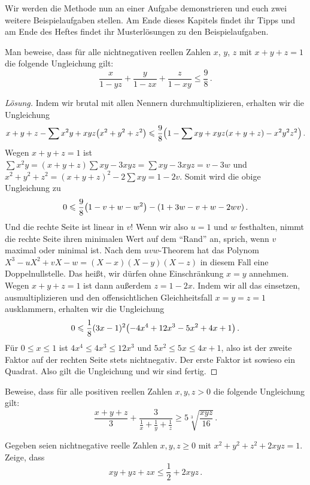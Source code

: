 Wir werden die Methode nun an einer Aufgabe demonstrieren und euch zwei weitere  Beispielaufgaben stellen. Am Ende dieses Kapitels findet ihr Tipps und am Ende des Heftes findet ihr Musterlösungen zu den Beispielaufgaben.
\begin{aufgabe*}
	Man beweise, dass für alle nichtnegativen reellen Zahlen $x$, $y$, $z$ mit $x+y+z=1$ die folgende Ungleichung gilt:
	\begin{equation*}
		\frac{x}{1-yz}+\frac{y}{1-zx}+\frac{z}{1-xy}\leqslant\frac 98\,.
	\end{equation*}
\end{aufgabe*}
\begin{proof}[Lösung]
	Indem wir brutal mit allen Nennern durchmultiplizieren, erhalten wir die Ungleichung
	\begin{equation*}
		x+y+z-\sum x^2y+xyz\parens*{x^2+y^2+z^2}\leqslant \frac 98\parens*{1-\sum xy+xyz(x+y+z)-x^2y^2z^2}\,.
	\end{equation*}
	Wegen $x+y+z=1$ ist $\sum x^2y=(x+y+z)\sum xy-3xyz=\sum xy-3xyz=v-3w$ und $x^2+y^2+z^2=(x+y+z)^2-2\sum xy=1-2v$. Somit wird die obige Ungleichung zu
	\begin{equation*}
		0\leqslant \frac 98\parens*{1-v+w-w^2}-\parens*{1+3w-v+w-2wv}\,.
	\end{equation*}
	Und die rechte Seite ist linear in $v$! Wenn wir also $u=1$ und $w$ festhalten, nimmt die rechte Seite ihren minimalen Wert auf dem \enquote{Rand} an, sprich, wenn $v$ maximal oder minimal ist. Nach dem $uvw$-Theorem hat das Polynom $X^3-uX^2+vX-w=(X-x)(X-y)(X-z)$ in diesem Fall eine Doppelnullstelle. Das heißt, wir dürfen ohne Einschränkung $x=y$ annehmen. Wegen $x+y+z=1$ ist dann außerdem $z=1-2x$. Indem wir all das einsetzen, ausmultiplizieren und den offensichtlichen Gleichheitsfall $x=y=z=1$ ausklammern, erhalten wir die Ungleichung
	\begin{equation*}
		0\leqslant \frac18(3x-1)^2\parens*{-4x^4+12x^3-5x^2+4x+1}\,.
	\end{equation*}
	Für $0\leqslant x\leqslant 1$ ist $4x^4\leqslant 4x^3\leqslant 12x^3$ und $5x^2\leqslant 5x\leqslant 4x+1$, also ist der zweite Faktor auf der rechten Seite stets nichtnegativ. Der erste Faktor ist sowieso ein Quadrat. Also gilt die Ungleichung und wir sind fertig.
\end{proof}

\begin{aufgabe*}\label{aufgabe:DEMO2015Ungleichung}
	Beweise, dass für alle positiven reellen Zahlen $x,y,z>0$ die folgende Ungleichung gilt:
	\begin{equation*}
		\frac{x+y+z}{3}+\frac{3}{\frac1x+\frac1y+\frac1z}\geqslant 5\sqrt[3]{\frac{xyz}{16}}\,.
	\end{equation*}
\end{aufgabe*}
\begin{aufgabe*}[*]\label{aufgabe:UngleichungInvertieren}
	Gegeben seien nichtnegative reelle Zahlen $x,y,z\geqslant 0$ mit $x^2+y^2+z^2+2xyz=1$. Zeige, dass
	\begin{equation*}
		xy+yz+zx\leqslant \frac12+2xyz\,.
	\end{equation*}
\end{aufgabe*}

